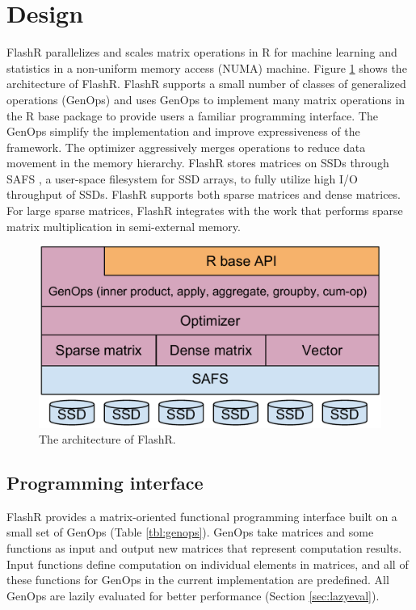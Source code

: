 \section{Design}

FlashR parallelizes and scales matrix operations in R for machine learning and
statistics in a non-uniform memory access (NUMA) machine. Figure \ref{fig:arch}
shows the architecture of FlashR.
FlashR supports a small number of classes of generalized operations (GenOps)
and uses GenOps to implement many matrix operations in the R base package
to provide users a familiar programming interface. The GenOps simplify
the implementation and improve expressiveness of the framework. The optimizer
aggressively merges operations to reduce data movement in the memory hierarchy.
FlashR stores matrices on SSDs through SAFS \cite{safs}, a user-space filesystem
for SSD arrays, to fully utilize high I/O throughput of SSDs.
FlashR supports both sparse matrices and dense matrices. For large sparse matrices,
FlashR integrates with the work \cite{SEM_SpMM} that performs sparse matrix
multiplication in semi-external memory.

\begin{figure}
\centering
\includegraphics[scale=0.3]{FlashMatrix_figs/architecture.pdf}
\vspace{-5pt}
\caption{The architecture of FlashR.}
\label{fig:arch}
\vspace{-10pt}
\end{figure}

\subsection{Programming interface} \label{sec:api}

FlashR provides a matrix-oriented functional programming interface built
on a small set of GenOps (Table \ref{tbl:genops}). GenOps take matrices
and some functions
as input and output new matrices that represent computation results.
Input functions define computation on individual elements in matrices,
and all of these functions for GenOps in the current implementation are
predefined. All GenOps are lazily evaluated for better performance (Section
\ref{sec:lazyeval}).

